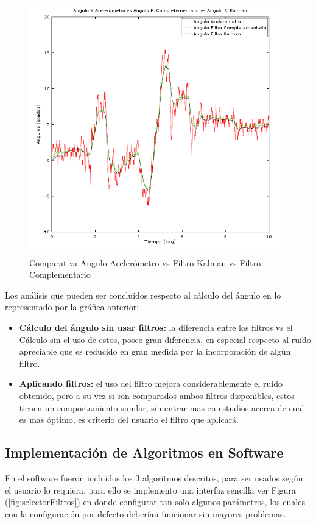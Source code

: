 \documentclass[12pt,a4paper]{article}
\begin{document}
\begin{figure}[H]
	\centering
	\includegraphics[scale=0.7]{images/angKalCom}
	\caption{Comparativa Angulo Acelerómetro vs Filtro Kalman vs Filtro Complementario}
	\label{fig:AnguloXvsFiltros}
\end{figure}

Los análisis que pueden ser concluidos respecto al cálculo del ángulo en lo representado por la gráfica anterior:
\begin{itemize}
	\item \textbf{Cálculo del ángulo sin usar filtros:} la diferencia entre los filtros vs el Cálculo sin el uso de estos, posee gran diferencia, en especial respecto al ruido apreciable que es reducido en gran medida por la incorporación de algún filtro.
	\item \textbf{Aplicando filtros:} el uso del filtro mejora considerablemente el ruido obtenido, pero a su vez si son comparados ambos filtros disponibles, estos tienen un comportamiento similar, sin entrar mas en estudios acerca de cual es mas óptimo, es criterio del usuario el filtro que aplicará.
\end{itemize}

\subsection{Implementación de Algoritmos en Software}
En el software fueron incluidos los 3 algoritmos descritos, para ser usados según el usuario lo requiera, para ello se implemento una interfaz sencilla ver Figura (\ref{fig:selectorFiltros}) en donde configurar tan solo algunos parámetros, los cuales con la configuración por defecto deberían funcionar sin mayores problemas.
\end{document}
